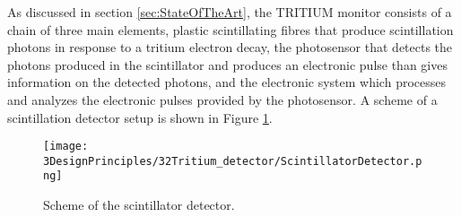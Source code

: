 As discussed in section \ref{sec:StateOfTheArt}, the TRITIUM monitor consists of a chain of three main elements, plastic scintillating fibres that produce scintillation photons in response to a tritium electron decay, the photosensor that detects the photons produced in the scintillator and produces an electronic pulse than gives information on the detected photons, and the electronic system which processes and analyzes the electronic pulses provided by the photosensor. A scheme of a scintillation detector setup is shown in Figure \ref{fig:ScintillatorDetector}.

\begin{figure}[hbtp]
\texttt{[image: 3DesignPrinciples/32Tritium\_detector/ScintillatorDetector.png]}
\centering
\caption{Scheme of the scintillator detector.\label{fig:ScintillatorDetector}}
\end{figure}
